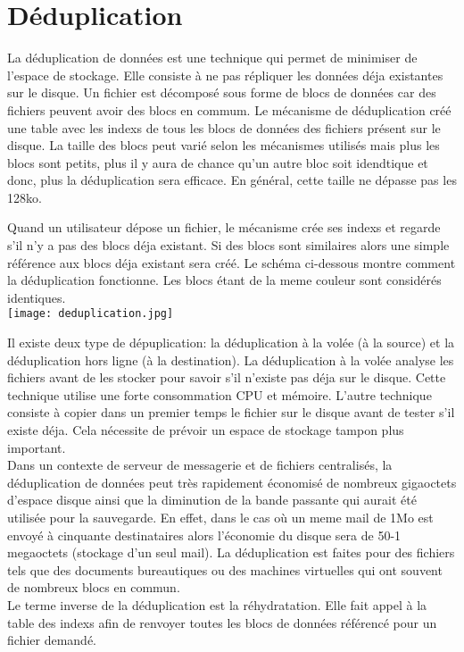 \documentclass[a4paper]{report}
\begin{document}
	\chapter*{Déduplication}
	La déduplication de données est une technique qui permet de minimiser de l'espace de stockage. Elle consiste à ne pas répliquer les données déja existantes sur le disque. Un fichier est décomposé sous forme de blocs de données car des fichiers peuvent avoir des blocs en commum. Le mécanisme de déduplication créé une table avec les indexs de tous les blocs de données des fichiers présent sur le disque. La taille des blocs peut varié selon les mécanismes utilisés mais plus les blocs sont petits, plus il y aura de chance qu'un autre bloc soit idendtique et donc, plus la déduplication sera efficace. En général, cette taille ne dépasse pas les 128ko.
 
 Quand un utilisateur dépose un fichier, le mécanisme crée ses indexs et regarde s'il n'y a pas des blocs déja existant. Si des blocs sont similaires alors une simple référence aux blocs déja existant sera créé. Le schéma ci-dessous montre comment la déduplication fonctionne. Les blocs étant de la meme couleur sont considérés identiques.\\
\texttt{[image: deduplication.jpg]}

Il existe deux type de dépuplication: la déduplication à la volée (à la source) et la déduplication hors ligne (à la destination). La déduplication à la volée analyse les fichiers avant de les stocker pour savoir s'il n'existe pas déja sur le disque. Cette technique utilise une forte consommation CPU et mémoire. L'autre technique consiste à copier dans un premier temps le fichier sur le disque avant de tester s'il existe déja. Cela nécessite de prévoir un espace de stockage tampon plus important. \\

Dans un contexte de serveur de messagerie et de fichiers centralisés, la déduplication de données peut très rapidement économisé de nombreux gigaoctets d'espace disque ainsi que la diminution de la bande passante qui aurait été utilisée pour la sauvegarde. En effet, dans le cas où un meme mail de 1Mo est envoyé à cinquante destinataires alors l'économie du disque sera de 50-1 megaoctets (stockage d'un seul mail). La déduplication est faites pour des fichiers tels que des documents bureautiques ou des machines virtuelles qui ont souvent de nombreux blocs en commun.\\
Le terme inverse de la déduplication est la réhydratation. Elle fait appel à la table des indexs afin de renvoyer toutes les blocs de données référencé pour un fichier demandé.\\
\end{document}
